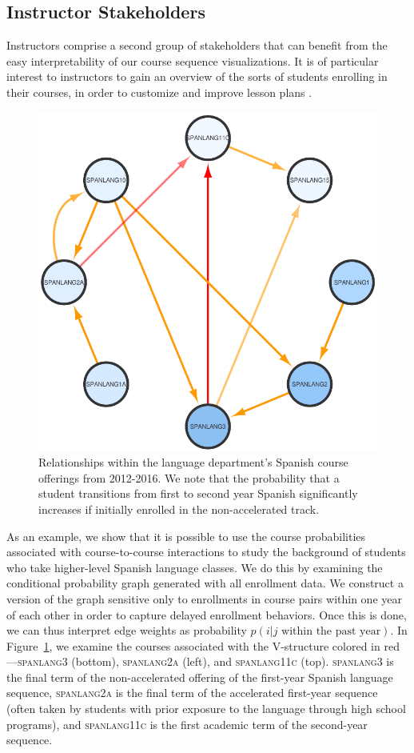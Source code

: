 \subsection{Instructor Stakeholders}
\label{sec:instructor_stakeholders}

Instructors comprise a second group of stakeholders that can benefit from
the easy interpretability of our course sequence visualizations. It is
of particular interest to instructors to gain an overview of the sorts
of students enrolling in their courses, in order to customize
and improve lesson plans \cite{Leaver2002}.

\begin{figure}[h]
    \centering
    \includegraphics[width=0.4\columnwidth]{Figs/final-spanlang.pdf}  
    \caption{Relationships within the language department's Spanish course offerings from 2012-2016. We note that the probability that a student transitions from first to second year Spanish significantly increases if initially enrolled in the non-accelerated track.}
    \label{fig:spanlang}
\end{figure}

As an example, we show that it is possible to use the course probabilities associated with course-to-course interactions to study the background of students who take higher-level Spanish language classes. We do this by examining the conditional probability graph generated with
all enrollment data. We construct a version of the graph sensitive only to
enrollments in course pairs within one year of each other in order to
capture delayed enrollment behaviors. Once this is done, we can thus interpret edge
weights as probability $p(i|j \text{ within the past year})$. In
Figure~\ref{fig:spanlang}, we examine the courses associated with the
V-structure colored in red---\textsc{spanlang3} (bottom),
\textsc{spanlang2a} (left), and \textsc{spanlang11c}
(top). \textsc{spanlang3} is the final term of the non-accelerated
offering of the first-year Spanish language sequence,
\textsc{spanlang2a} is the final term of the accelerated first-year
sequence (often taken by students with prior exposure to the language
through high school programs), and \textsc{spanlang11c} is the first
academic term of the second-year sequence.

